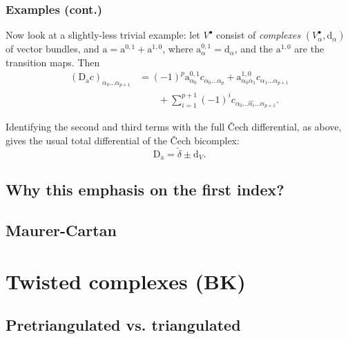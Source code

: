 \documentclass{beamer}
\begin{document}
            \begin{frame}\frametitle{Examples (cont.)}
                \begin{example}
                    Now look at a slightly-less trivial example: let $V^\bullet$ consist of \emph{complexes} $(V_\alpha^\bullet,\mathrm{d}_\alpha)$ of vector bundles, and $\mathrm{a} = \mathrm{a}^{0,1}+\mathrm{a}^{1,0}$, where $\mathrm{a}_{\alpha}^{0,1} = \mathrm{d}_\alpha$, and the $\mathrm{a}^{1,0}$ are the transition maps.
                    Then
                    \begin{align*}
                        (\mathrm{D}_\mathrm{a}c)_{\alpha_0\ldots\alpha_{p+1}} &= (-1)^p\mathrm{a}_{\alpha_0}^{0,1}c_{\alpha_0\ldots\alpha_p} + \mathrm{a}_{\alpha_0\alpha_1}^{1,0}c_{\alpha_1\ldots\alpha_{p+1}}\\
                        &\qquad+\sum_{i=1}^{p+1}(-1)^i c_{\alpha_0\ldots\widehat{\alpha_i}\ldots\alpha_{p+1}}.
                    \end{align*}

                    \pause
                    
                    Identifying the second and third terms with the full Čech differential, as above, gives the usual total differential of the Čech bicomplex:
                    \begin{equation*}
                        \mathrm{D}_\mathrm{a} = \check{\delta} \pm \mathrm{d}_V.
                    \end{equation*}
                \end{example}
            \end{frame}

        \subsection{Why this emphasis on the first index?}

        \subsection{Maurer-Cartan}


    \section{Twisted complexes (BK)}
        
        \subsection{Pretriangulated vs. triangulated}
        
\end{document}

